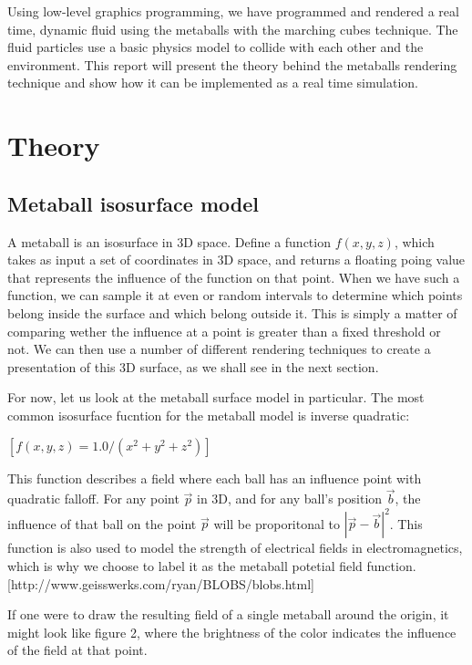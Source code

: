 \documentclass{article}
\begin{document}
    Using low-level graphics programming, we have programmed and rendered a real time, dynamic fluid using the metaballs with the marching cubes technique. The fluid particles use a basic physics model to collide with each other and the environment.
    This report will present the theory behind the metaballs rendering technique and show how it can be implemented as a real time simulation.

    \section{Theory}

        \subsection{Metaball isosurface model}
            A metaball is an isosurface in 3D space. 
            Define a function $f(x,y,z)$, which takes as input a set of coordinates in 3D space, and returns a floating poing value that represents the influence of the function on that point.
            When we have such a function, we can sample it at even or random intervals to determine which points belong inside the surface and which belong outside it.
            This is simply a matter of comparing wether the influence at a point is greater than a fixed threshold or not.
            We can then use a number of different rendering techniques to create a presentation of this 3D surface, as we shall see in the next section.

            For now, let us look at the metaball surface model in particular. The most common isosurface fucntion for the metaball model is inverse quadratic:

            $[f(x,y,z) = 1.0 / (x^2 + y^2 + z^2)]$

            This function describes a field where each ball has an influence point with quadratic falloff.
            For any point $\vec{p}$ in 3D, and for any ball's position $\vec{b}$, the influence of that ball on the point $\vec{p}$ will be proporitonal to $|\vec{p} - \vec{b}|^2$.
            This function is also used to model the strength of electrical fields in electromagnetics, which is why we choose to label it as the metaball potetial field function.
            [http://www.geisswerks.com/ryan/BLOBS/blobs.html]

            If one were to draw the resulting field of a single metaball around the origin, it might look like figure 2, where the brightness of the color indicates the influence of the field at that point.
            
\end{document}
